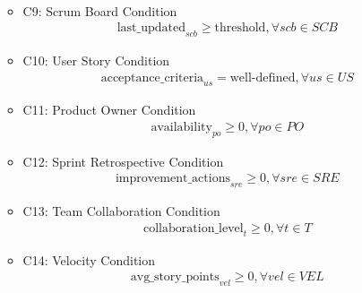 \documentclass{article}
\begin{document}
\begin{itemize}
\begin{itemize}
\begin{align*}
        \end{align*}
    \item C9: Scrum Board Condition
        \begin{align*}
            \text{last\_updated}_{scb} \geq \text{threshold}, \forall scb \in SCB
        \end{align*}
    \item C10: User Story Condition
        \begin{align*}
            \text{acceptance\_criteria}_{us} = \text{well-defined}, \forall us \in US
        \end{align*}
    \item C11: Product Owner Condition
        \begin{align*}
            \text{availability}_{po} \geq 0, \forall po \in PO
        \end{align*}
    \item C12: Sprint Retrospective Condition
        \begin{align*}
            \text{improvement\_actions}_{sre} \geq 0, \forall sre \in SRE
        \end{align*}
    \item C13: Team Collaboration Condition
        \begin{align*}
            \text{collaboration\_level}_t \geq 0, \forall t \in T
        \end{align*}
    \item C14: Velocity Condition
        \begin{align*}
            \text{avg\_story\_points}_{vel} \geq 0, \forall vel \in VEL
        \end{align*}


\end{itemize}
\end{itemize}
\end{document}
